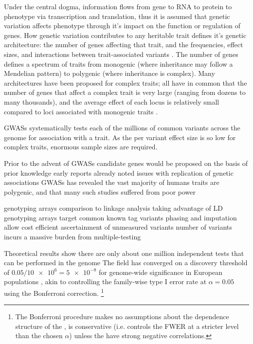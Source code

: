 \begin{outline}
\1 Under the central dogma, information flows from gene to RNA to protein to phenotype via transcription and translation, thus it is assumed that genetic variation affects phenotype through it's impact on the function or regulation of genes.
How genetic variation contributes to any heritable trait defines it's genetic architecture: the number of genes affecting that trait, and the frequencies, effect sizes, and interactions between trait-associated variants \autocite{visscher2019Fisher1918Paper}.
The number of genes defines a spectrum of traits from monogenic (where inheritance may follow a Mendelian pattern) to polygenic (where inheritance is complex).
Many architectures have been proposed for complex traits; all have in common that the number of genes that affect a complex trait is very large (ranging from dozens to many thousands),
and the average effect of each locus is relatively small compared to loci associated with monogenic traits \autocite{gibson2011RareCommonVariants,boyle2017ExpandedViewComplex}.

\1 \glspl{GWAS} systematically tests each of the millions of common variants across the genome for association with a trait.
As the per variant effect size is so low for complex traits, enormous sample sizes are required.

    \2 Prior to the advent of \glspl{GWAS} candidate genes would be proposed on the basis of prior knowledge
    \2 early reports already noted issues with replication of genetic associations \autocite{hirschhorn2002ComprehensiveReviewGenetic}
\glspl{GWAS} has revealed the vast majority of humans traits are polygenic, and that many such studies suffered from poor power \autocite{border2019NoSupportHistorical}

\1 genotyping arrays
    \2 comparison to linkage analysis \autocite{altshuler2008GeneticMappingHuman}
    \2 taking advantage of LD 
    \2 genotyping arrays target common known tag variants
    \2 phasing and imputation allow cost efficient ascertainment of unmeasured variants 
    \2 number of variants incurs a massive burden from multiple-testing

    \2 Theoretical results show there are only about one million independent tests that can be performed in the genome
    \2 The field has converged on a discovery threshold of $0.05 / \num{10e6} = \num{5e-8}$ for genome-wide significance in European populations \autocite{jannot2015108HasEmerged}, 
    akin to controlling the family-wise type I error rate at $\alpha = 0.05$ using the Bonferroni correction.%
    \footnote{The Bonferroni procedure makes no assumptions about the dependence structure of the \pvalues, is conservative (i.e. controls the \gls{FWER} at a stricter level than the chosen $\alpha$) unless the \pvalues have strong negative correlations.}


\end{outline}
